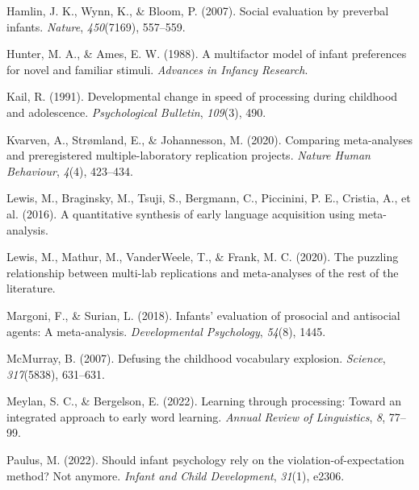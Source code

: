 \documentclass[10pt, letterpaper]{article}
\newenvironment{CSLReferences}%
  {}%
  {\par}
\begin{document}
\begin{CSLReferences}{1}{0}
\leavevmode{}%
Hamlin, J. K., Wynn, K., \& Bloom, P. (2007). Social evaluation by
preverbal infants. \emph{Nature}, \emph{450}(7169), 557--559.

\leavevmode{}%
Hunter, M. A., \& Ames, E. W. (1988). A multifactor model of infant
preferences for novel and familiar stimuli. \emph{Advances in Infancy
Research}.

\leavevmode{}%
Kail, R. (1991). Developmental change in speed of processing during
childhood and adolescence. \emph{Psychological Bulletin}, \emph{109}(3),
490.

\leavevmode{}%
Kvarven, A., Strømland, E., \& Johannesson, M. (2020). Comparing
meta-analyses and preregistered multiple-laboratory replication
projects. \emph{Nature Human Behaviour}, \emph{4}(4), 423--434.

\leavevmode{}%
Lewis, M., Braginsky, M., Tsuji, S., Bergmann, C., Piccinini, P. E.,
Cristia, A., et al. (2016). A quantitative synthesis of early language
acquisition using meta-analysis.

\leavevmode{}%
Lewis, M., Mathur, M., VanderWeele, T., \& Frank, M. C. (2020). The
puzzling relationship between multi-lab replications and meta-analyses
of the rest of the literature.

\leavevmode{}%
Margoni, F., \& Surian, L. (2018). Infants' evaluation of prosocial and
antisocial agents: A meta-analysis. \emph{Developmental Psychology},
\emph{54}(8), 1445.

\leavevmode{}%
McMurray, B. (2007). Defusing the childhood vocabulary explosion.
\emph{Science}, \emph{317}(5838), 631--631.

\leavevmode{}%
Meylan, S. C., \& Bergelson, E. (2022). Learning through processing:
Toward an integrated approach to early word learning. \emph{Annual
Review of Linguistics}, \emph{8}, 77--99.

\leavevmode{}%
Paulus, M. (2022). Should infant psychology rely on the
violation-of-expectation method? Not anymore. \emph{Infant and Child
Development}, \emph{31}(1), e2306.


\end{CSLReferences}
\end{document}
